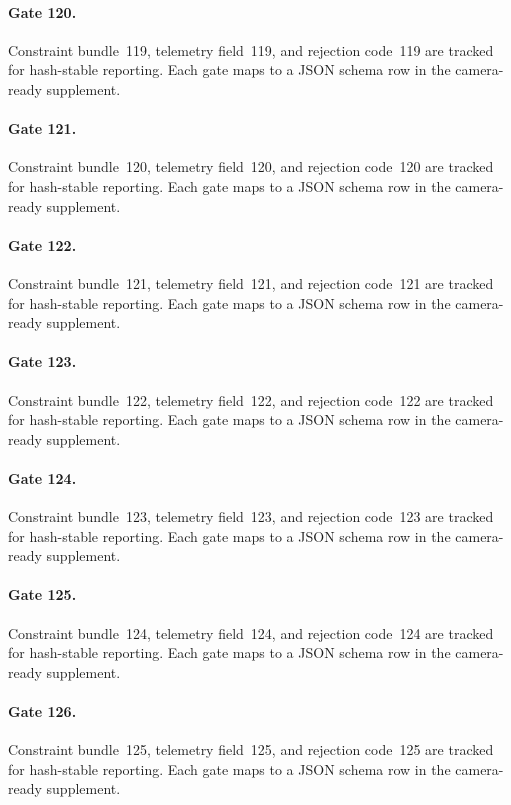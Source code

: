 \documentclass[sigconf,nonacm]{acmart}
\begin{document}
\paragraph{Gate 120.}
Constraint bundle~119, telemetry field~119, and rejection code~119 are tracked for hash-stable reporting. Each gate maps to a JSON schema row in the camera-ready supplement. %

\paragraph{Gate 121.}
Constraint bundle~120, telemetry field~120, and rejection code~120 are tracked for hash-stable reporting. Each gate maps to a JSON schema row in the camera-ready supplement. %

\paragraph{Gate 122.}
Constraint bundle~121, telemetry field~121, and rejection code~121 are tracked for hash-stable reporting. Each gate maps to a JSON schema row in the camera-ready supplement. %

\paragraph{Gate 123.}
Constraint bundle~122, telemetry field~122, and rejection code~122 are tracked for hash-stable reporting. Each gate maps to a JSON schema row in the camera-ready supplement. %

\paragraph{Gate 124.}
Constraint bundle~123, telemetry field~123, and rejection code~123 are tracked for hash-stable reporting. Each gate maps to a JSON schema row in the camera-ready supplement. %

\paragraph{Gate 125.}
Constraint bundle~124, telemetry field~124, and rejection code~124 are tracked for hash-stable reporting. Each gate maps to a JSON schema row in the camera-ready supplement. %

\paragraph{Gate 126.}
Constraint bundle~125, telemetry field~125, and rejection code~125 are tracked for hash-stable reporting. Each gate maps to a JSON schema row in the camera-ready supplement. %
\end{document}
